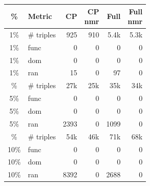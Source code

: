 \documentclass[a4paper,UKenglish,cleveref, autoref, thm-restate]{tgdk-v2021}
\begin{document}
\begin{table}[]
\begin{minipage}[t]{0.49\linewidth}
\begin{tabular}{c l | r r r r}
\toprule
\% & Metric & CP & \shortstack{CP\\nmr} & Full & \shortstack{Full\\nmr} \\
\midrule
1\% & \# triples & 925 & 910 & 5.4k & 5.3k \\
1\% & func & 0 & 0 & 0 & 0 \\
1\% & dom & 0 & 0 & 0 & 0 \\
1\% & ran & 15 & 0 & 97 & 0 \\
\addlinespace
5\% & \# triples & 27k & 25k & 35k & 34k \\
5\% & func & 0 & 0 & 0 & 0 \\
5\% & dom & 0 & 0 & 0 & 0 \\
5\% & ran & 2393 & 0 & 1099 & 0 \\
\addlinespace
10\% & \# triples & 54k & 46k & 71k & 68k \\
10\% & func & 0 & 0 & 0 & 0 \\
10\% & dom & 0 & 0 & 0 & 0 \\
10\% & ran & 8392 & 0 & 2688 & 0 \\
\bottomrule
\end{tabular}
\end{minipage}%
\end{table}
\end{document}
